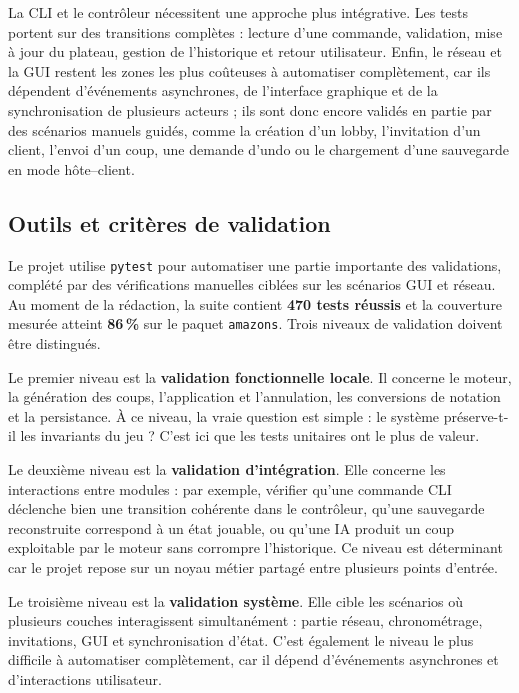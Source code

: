 \documentclass[a4paper]{article}
\begin{document}
La CLI et le contrôleur nécessitent une approche plus intégrative. Les tests portent sur des transitions complètes : lecture d'une commande, validation, mise à jour du plateau, gestion de l'historique et retour utilisateur. Enfin, le réseau et la GUI restent les zones les plus coûteuses à automatiser complètement, car ils dépendent d'événements asynchrones, de l'interface graphique et de la synchronisation de plusieurs acteurs ; ils sont donc encore validés en partie par des scénarios manuels guidés, comme la création d'un lobby, l'invitation d'un client, l'envoi d'un coup, une demande d'undo ou le chargement d'une sauvegarde en mode hôte--client.

\subsection{Outils et critères de validation}

Le projet utilise \texttt{pytest} \cite{pytest2024} pour automatiser une partie importante des validations, complété par des vérifications manuelles ciblées sur les scénarios GUI et réseau. Au moment de la rédaction, la suite contient \textbf{470 tests réussis} et la couverture mesurée atteint \textbf{86\,\%} sur le paquet \texttt{amazons}. Trois niveaux de validation doivent être distingués.

Le premier niveau est la \textbf{validation fonctionnelle locale}. Il concerne le moteur, la génération des coups, l'application et l'annulation, les conversions de notation et la persistance. À ce niveau, la vraie question est simple : le système préserve-t-il les invariants du jeu ? C'est ici que les tests unitaires ont le plus de valeur.

Le deuxième niveau est la \textbf{validation d'intégration}. Elle concerne les interactions entre modules : par exemple, vérifier qu'une commande CLI déclenche bien une transition cohérente dans le contrôleur, qu'une sauvegarde reconstruite correspond à un état jouable, ou qu'une IA produit un coup exploitable par le moteur sans corrompre l'historique. Ce niveau est déterminant car le projet repose sur un noyau métier partagé entre plusieurs points d'entrée.

Le troisième niveau est la \textbf{validation système}. Elle cible les scénarios où plusieurs couches interagissent simultanément : partie réseau, chronométrage, invitations, GUI et synchronisation d'état. C'est également le niveau le plus difficile à automatiser complètement, car il dépend d'événements asynchrones et d'interactions utilisateur.
\end{document}
